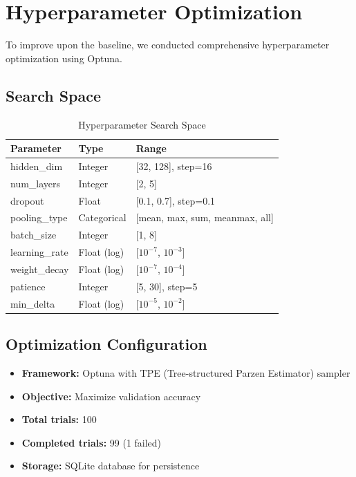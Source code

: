 \section{Hyperparameter Optimization}

To improve upon the baseline, we conducted comprehensive hyperparameter optimization using Optuna.

\subsection{Search Space}

\begin{table}[H]
\centering
\caption{Hyperparameter Search Space}
\label{tab:hyperopt_search_space}
\begin{tabular}{lll}
\toprule
\textbf{Parameter} & \textbf{Type} & \textbf{Range} \\
\midrule
hidden\_dim & Integer & [32, 128], step=16 \\
num\_layers & Integer & [2, 5] \\
dropout & Float & [0.1, 0.7], step=0.1 \\
pooling\_type & Categorical & [mean, max, sum, meanmax, all] \\
batch\_size & Integer & [1, 8] \\
learning\_rate & Float (log) & [$10^{-7}$, $10^{-3}$] \\
weight\_decay & Float (log) & [$10^{-7}$, $10^{-4}$] \\
patience & Integer & [5, 30], step=5 \\
min\_delta & Float (log) & [$10^{-5}$, $10^{-2}$] \\
\bottomrule
\end{tabular}
\end{table}

\subsection{Optimization Configuration}

\begin{itemize}
    \item \textbf{Framework:} Optuna with TPE (Tree-structured Parzen Estimator) sampler
    \item \textbf{Objective:} Maximize validation accuracy
    \item \textbf{Total trials:} 100
    \item \textbf{Completed trials:} 99 (1 failed)
    \item \textbf{Storage:} SQLite database for persistence
\end{itemize}

